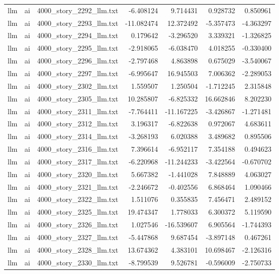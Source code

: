 \begin{longtable}{lllrrrr}
llm & ai & 4000\_story\_2292\_llm.txt & -6.408124 & 9.714431 & 0.928732 & 0.850961 \\
llm & ai & 4000\_story\_2293\_llm.txt & -11.082474 & 12.372492 & -5.357473 & -4.363297 \\
llm & ai & 4000\_story\_2294\_llm.txt & 0.179642 & -3.296520 & 3.339321 & -1.326825 \\
llm & ai & 4000\_story\_2295\_llm.txt & -2.918065 & -6.038470 & 4.018255 & -0.330400 \\
llm & ai & 4000\_story\_2296\_llm.txt & -2.797468 & 4.863898 & 0.675029 & -3.540067 \\
llm & ai & 4000\_story\_2297\_llm.txt & -6.995647 & 16.945503 & 7.006362 & -2.289053 \\
llm & ai & 4000\_story\_2302\_llm.txt & 1.559507 & 1.250504 & -1.712245 & 2.315848 \\
llm & ai & 4000\_story\_2305\_llm.txt & 10.285807 & -6.825332 & 16.662846 & 8.202230 \\
llm & ai & 4000\_story\_2311\_llm.txt & -7.764411 & -11.167225 & -3.426867 & -1.271481 \\
llm & ai & 4000\_story\_2312\_llm.txt & 3.196317 & -6.822638 & 0.972067 & 4.683611 \\
llm & ai & 4000\_story\_2314\_llm.txt & -3.268193 & 6.020388 & 3.489682 & 0.895506 \\
llm & ai & 4000\_story\_2316\_llm.txt & 7.396614 & -6.952117 & 7.354188 & 0.494623 \\
llm & ai & 4000\_story\_2317\_llm.txt & -6.220968 & -11.244233 & -3.422564 & -0.670702 \\
llm & ai & 4000\_story\_2320\_llm.txt & 5.667382 & -1.441028 & 7.848889 & 4.063027 \\
llm & ai & 4000\_story\_2321\_llm.txt & -2.246672 & -0.402556 & 6.868464 & 1.090466 \\
llm & ai & 4000\_story\_2322\_llm.txt & 1.511076 & 0.355835 & 7.456471 & 2.489152 \\
llm & ai & 4000\_story\_2325\_llm.txt & 19.474347 & 1.778033 & 6.300372 & 5.119590 \\
llm & ai & 4000\_story\_2326\_llm.txt & 1.027546 & -16.539607 & 6.905564 & -1.744393 \\
llm & ai & 4000\_story\_2327\_llm.txt & -5.447868 & 9.687454 & -3.897148 & 0.467261 \\
llm & ai & 4000\_story\_2328\_llm.txt & 13.674362 & 4.383101 & 10.698467 & -2.126316 \\
llm & ai & 4000\_story\_2330\_llm.txt & -8.799539 & 9.526781 & -0.596009 & -2.750733 \\

\end{longtable}
